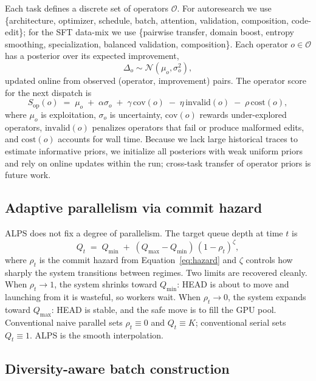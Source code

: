 \documentclass{article}
\newcommand{\alps}{ALPS\xspace}
\begin{document}
Each task defines a discrete set of operators $\mathcal{O}$. For autoresearch we use \{architecture, optimizer, schedule, batch, attention, validation, composition, code-edit\}; for the SFT data-mix we use \{pairwise transfer, domain boost, entropy smoothing, specialization, balanced validation, composition\}. Each operator $o \in \mathcal{O}$ has a posterior over its expected improvement,
\[
  \Delta_o \sim \mathcal{N}(\mu_o, \sigma_o^2),
\]
updated online from observed (operator, improvement) pairs. The operator score for the next dispatch is
\begin{equation}
  S_{\mathrm{op}}(o) \;=\; \mu_o \;+\; \alpha \sigma_o \;+\; \gamma \, \mathrm{cov}(o) \;-\; \eta \, \mathrm{invalid}(o) \;-\; \rho \, \mathrm{cost}(o),
  \label{eq:op}
\end{equation}
where $\mu_o$ is exploitation, $\sigma_o$ is uncertainty, $\mathrm{cov}(o)$ rewards under-explored operators, $\mathrm{invalid}(o)$ penalizes operators that fail or produce malformed edits, and $\mathrm{cost}(o)$ accounts for wall time. Because we lack large historical traces to estimate informative priors, we initialize all posteriors with weak uniform priors and rely on online updates within the run; cross-task transfer of operator priors is future work.

\subsection{Adaptive parallelism via commit hazard}
\label{sec:alps:hazard}

\alps does not fix a degree of parallelism. The target queue depth at time $t$ is
\begin{equation}
  Q_t \;=\; Q_{\min} \;+\; (Q_{\max} - Q_{\min})\,(1 - \rho_t)^{\zeta},
  \label{eq:queue}
\end{equation}
where $\rho_t$ is the commit hazard from Equation~\ref{eq:hazard} and $\zeta$ controls how sharply the system transitions between regimes. Two limits are recovered cleanly. When $\rho_t \to 1$, the system shrinks toward $Q_{\min}$: HEAD is about to move and launching from it is wasteful, so workers wait. When $\rho_t \to 0$, the system expands toward $Q_{\max}$: HEAD is stable, and the safe move is to fill the GPU pool. Conventional naive parallel sets $\rho_t \equiv 0$ and $Q_t \equiv K$; conventional serial sets $Q_t \equiv 1$. \alps is the smooth interpolation.

\subsection{Diversity-aware batch construction}
\label{sec:alps:batch}
\end{document}
